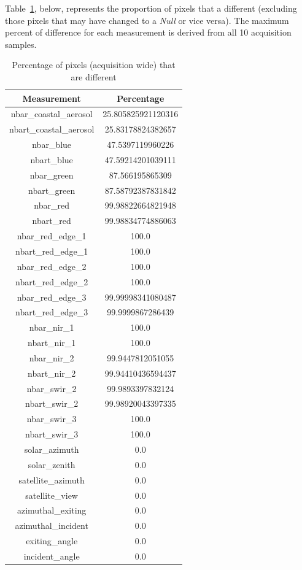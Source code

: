 \documentclass[a4paper]{article}
\begin{document}
  \clearpage

    \begin{flushleft}
      Table~\ref{table:4}, below, represents the proportion of pixels that a different (excluding those pixels that may have changed to a \textit{Null} or vice versa). The maximum percent of difference for each measurement is derived from all 10 acquisition samples.
    \end{flushleft}

    \begin{table}[ht!]
      \caption{Percentage of pixels (acquisition wide) that are different}\label{table:4}
      \centering
      \begin{tabular}{cc} \midrule
        \textbf{Measurement} & \textbf{Percentage} \\ \midrule
        nbar\_coastal\_aerosol & 25.805825921120316 \\
        nbart\_coastal\_aerosol & 25.83178824382657 \\
        nbar\_blue & 47.5397119960226 \\
        nbart\_blue & 47.59214201039111 \\
        nbar\_green & 87.566195865309 \\
        nbart\_green & 87.58792387831842 \\
        nbar\_red & 99.98822664821948 \\
        nbart\_red & 99.98834774886063 \\
        nbar\_red\_edge\_1 & 100.0 \\
        nbart\_red\_edge\_1 & 100.0 \\
        nbar\_red\_edge\_2 & 100.0 \\
        nbart\_red\_edge\_2 & 100.0 \\
        nbar\_red\_edge\_3 & 99.99998341080487 \\
        nbart\_red\_edge\_3 & 99.9999867286439 \\
        nbar\_nir\_1 & 100.0 \\
        nbart\_nir\_1 & 100.0 \\
        nbar\_nir\_2 & 99.9447812051055 \\
        nbart\_nir\_2 & 99.94410436594437 \\
        nbar\_swir\_2 & 99.9893397832124 \\
        nbart\_swir\_2 & 99.98920043397335 \\
        nbar\_swir\_3 & 100.0 \\
        nbart\_swir\_3 & 100.0 \\
        solar\_azimuth & 0.0 \\
        solar\_zenith & 0.0 \\
        satellite\_azimuth & 0.0 \\
        satellite\_view & 0.0 \\
        azimuthal\_exiting & 0.0 \\
        azimuthal\_incident & 0.0 \\
        exiting\_angle & 0.0 \\
        incident\_angle & 0.0 \\ \midrule
      \end{tabular}
    \end{table}
\end{document}
